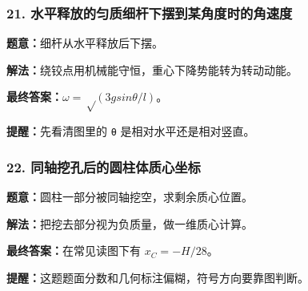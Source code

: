 \documentclass[12pt,a4paper]{ctexart}
\begin{document}
\subsubsection*{21. 水平释放的匀质细杆下摆到某角度时的角速度}
\begin{tcolorbox}[colback=gray!2!white,colframe=black!60,title={题目}]
\textbf{题意：}细杆从水平释放后下摆。\par
\end{tcolorbox}
\begin{tcolorbox}[colback=blue!2!white,colframe=blue!55!black,title={完整答案}]
\textbf{解法：}绕铰点用机械能守恒，重心下降势能转为转动动能。\par
\textbf{最终答案：}\(ω=√(3g sinθ/l)\)。\par

\end{tcolorbox}
\begin{tcolorbox}[colback=red!2!white,colframe=red!55!black,title={易错点}]
\textbf{提醒：}先看清图里的 \texttt{θ} 是相对水平还是相对竖直。\par
\end{tcolorbox}

\subsubsection*{22. 同轴挖孔后的圆柱体质心坐标}
\begin{tcolorbox}[colback=gray!2!white,colframe=black!60,title={题目}]
\textbf{题意：}圆柱一部分被同轴挖空，求剩余质心位置。\par
\end{tcolorbox}
\begin{tcolorbox}[colback=blue!2!white,colframe=blue!55!black,title={完整答案}]
\textbf{解法：}把挖去部分视为负质量，做一维质心计算。\par
\textbf{最终答案：}在常见读图下有 \(x_C=-H/28\)。\par

\end{tcolorbox}
\begin{tcolorbox}[colback=red!2!white,colframe=red!55!black,title={易错点}]
\textbf{提醒：}这题题面分数和几何标注偏糊，符号方向要靠图判断。\par
\end{tcolorbox}
\end{document}
